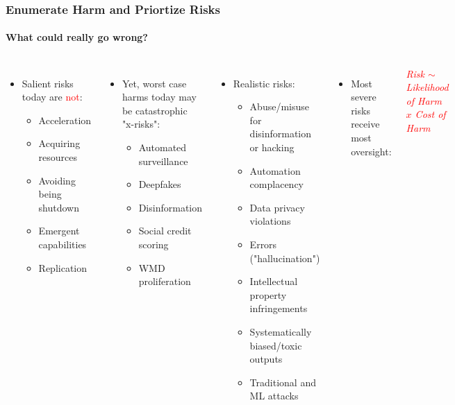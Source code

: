 \documentclass[11pt,
               aspectratio=169,
               hyperref={colorlinks}
               ]{beamer}
\begin{document}
		\begin{frame}
			
			\frametitle{Enumerate Harm and Priortize Risks}
			\framesubtitle{What could really go wrong?}
			
			\begin{columns}
				\vspace{-5pt}
				\begin{itemize}
					\item Salient risks today are \textcolor{red}{not}:
						\begin{itemize}
							\item Acceleration
							\item Acquiring resources
							\item Avoiding being shutdown
							\item Emergent capabilities
							\item Replication 
						\end{itemize}
				\end{itemize}
				\begin{itemize}
					\item Yet, worst case harms today may be catastrophic "x-risks":
						\begin{itemize}
							\item Automated surveillance
							\item Deepfakes
							\item Disinformation
							\item Social credit scoring
							\item WMD proliferation
						\end{itemize}
				\end{itemize}
				\vspace{-5pt}
				\begin{itemize}
					\item Realistic risks:
						\begin{itemize}
							\item Abuse/misuse for disinformation or hacking
							\item Automation complacency
							\item Data privacy violations
							\item Errors ("hallucination")
							\item Intellectual property infringements
							\item Systematically biased/toxic outputs
							\item Traditional and ML attacks
						\end{itemize}
				\end{itemize}
				\begin{itemize}
					\item Most severe risks receive most oversight:
				\end{itemize}
				\vspace{10pt}
				\textcolor{red}{\textit{Risk $\sim$ Likelihood of Harm $x$ Cost of Harm}}
			\end{columns}
					
		\end{frame}
\end{document}
